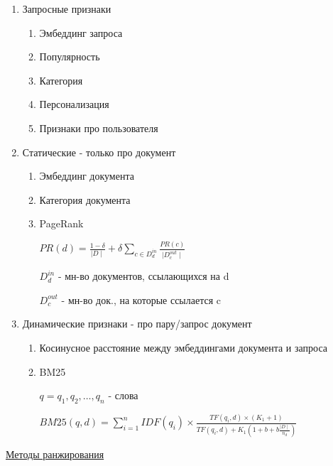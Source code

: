 \documentclass[a4paper, 12pt]{article}
\begin{document}
\begin{enumerate}
    \item Запросные признаки
    
    \begin{enumerate}
        \item Эмбеддинг запроса
        \item Популярность
        \item Категория
        \item Персонализация
        \item Признаки про пользователя
    \end{enumerate}

    \item Статические - только про документ
    
    \begin{enumerate}
        \item Эмбеддинг документа
        \item Категория документа
        \item PageRank
        
        $PR(d) = \frac{1 - \delta}{\mid D \mid} + 
        \delta \sum_{c \in D_{d}^{in}} \frac{PR(c)}
        {\mid D_c^{out} \mid}$ 

        $D_d^{in}$ - мн-во документов, ссылающихся на d

        $D_c^{out}$ - мн-во док., на которые ссылается c
    \end{enumerate}

    \item Динамические признаки - про пару/запрос документ
    
    \begin{enumerate}
        \item Косинусное расстояние между эмбеддингами 
        документа и запроса
        \item BM25
        
        $q = q_1, q_2, \ldots, q_n$ - слова

        $BM25(q, d) = \sum_{i = 1}^n IDF(q_i) \times 
        \frac{TF(q_i, d) \times (K_1 + 1)}{TF(q_i, d) + 
        K_1(1 + b + b\frac{\mid D \mid}{n_d})}$
    \end{enumerate}
\end{enumerate}

\underline{Методы ранжирования}
\end{document}
